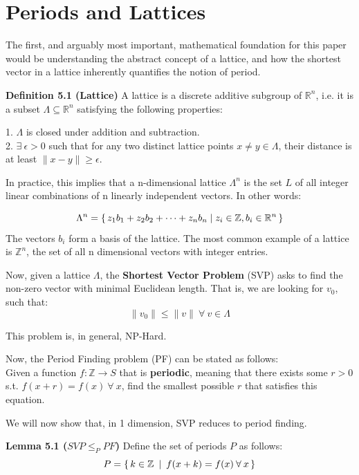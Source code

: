 \chapter{Periods and Lattices}

The first, and arguably most important, mathematical foundation for this paper would be understanding the abstract concept of a lattice, and how the shortest vector in a lattice inherently quantifies the notion of period.

\textbf{Definition 5.1 (Lattice)} A lattice is a discrete additive subgroup of $\mathbb{R}^n$, i.e. it is a subset $\Lambda \subseteq \mathbb{R}^n$ satisfying the following properties:

1. $\Lambda$ is closed under addition and subtraction.\\
2. $\exists \:\epsilon > 0$ such that for any two distinct lattice points $x\neq y \in  \Lambda$, their distance is at least $\lVert x - y \rVert \geq \epsilon$.

In practice, this implies that a n-dimensional lattice $\Lambda^n$ is the set $L$ of all integer linear combinations of n linearly independent vectors. In other words:

\begin{equation}
    \Lambda^n = \set{z_1b_1+z_2b_2+\dots +z_nb_n | z_i \in \mathbb{Z},b_i \in \mathbb{R}^n}
\end{equation}
The vectors $b_i$ form a basis of the lattice. The most common example of a lattice is $\mathbb{Z}^n$, the set of all n dimensional vectors with integer entries. 

Now, given a lattice $\Lambda$, the \textbf{Shortest Vector Problem} (SVP) asks to find the non-zero vector with minimal Euclidean length. That is, we are looking for $v_0$, such that:
\begin{equation}
    \lVert v_0\rVert \leq \lVert v\rVert \:\forall \:v \in \Lambda
\end{equation}

This problem is, in general, NP-Hard\cite{Kreuzer2025}.

Now, the Period Finding problem (PF) can be stated as follows:\\
Given a function $f: \mathbb{Z}\to S$ that is \textbf{periodic}, meaning that there exists some $r > 0$ s.t. $f(x+r) = f(x)\: \forall \:x$, find the smallest possible $r$ that satisfies this equation.

We will now show that, in 1 dimension, SVP reduces to period finding.

\textbf{Lemma 5.1 ($SVP \le_P PF$)} Define the set of periods $P$ as follows:
\begin{equation}
    P = \set{k\in \mathbb{Z}\: | \:f(x+k) = f(x)\: \forall \:x}
\end{equation}

